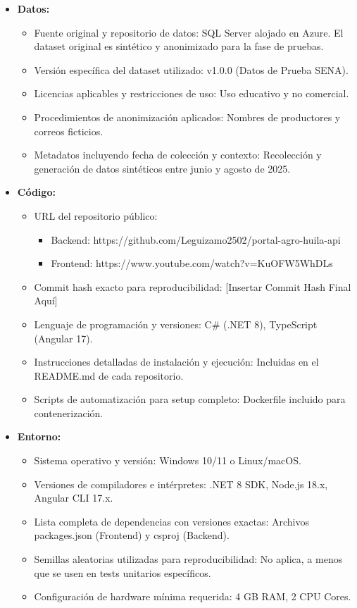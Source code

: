 \begin{itemize}[leftmargin=*]
\item \textbf{Datos:}
  \begin{itemize}
  \item Fuente original y repositorio de datos: SQL Server alojado en Azure. El dataset original es sintético y anonimizado para la fase de pruebas.
  \item Versión específica del dataset utilizado: v1.0.0 (Datos de Prueba SENA).
  \item Licencias aplicables y restricciones de uso: Uso educativo y no comercial.
  \item Procedimientos de anonimización aplicados: Nombres de productores y correos ficticios.
  \item Metadatos incluyendo fecha de colección y contexto: Recolección y generación de datos sintéticos entre junio y agosto de 2025.
  \end{itemize}

\item \textbf{Código:}
  \begin{itemize}
  \item URL del repositorio público:
    \begin{itemize}
    \item Backend: https://github.com/Leguizamo2502/portal-agro-huila-api
    \item Frontend: https://www.youtube.com/watch?v=KuOFW5WhDLs
    \end{itemize}
  \item Commit hash exacto para reproducibilidad: [Insertar Commit Hash Final Aquí]
  \item Lenguaje de programación y versiones: C\# (.NET 8), TypeScript (Angular 17).
  \item Instrucciones detalladas de instalación y ejecución: Incluidas en el README.md de cada repositorio.
  \item Scripts de automatización para setup completo: Dockerfile incluido para contenerización.
  \end{itemize}

\item \textbf{Entorno:}
  \begin{itemize}
  \item Sistema operativo y versión: Windows 10/11 o Linux/macOS.
  \item Versiones de compiladores e intérpretes: .NET 8 SDK, Node.js 18.x, Angular CLI 17.x.
  \item Lista completa de dependencias con versiones exactas: Archivos packages.json (Frontend) y csproj (Backend).
  \item Semillas aleatorias utilizadas para reproducibilidad: No aplica, a menos que se usen en tests unitarios específicos.
  \item Configuración de hardware mínima requerida: 4 GB RAM, 2 CPU Cores.
  \end{itemize}


\end{itemize}
